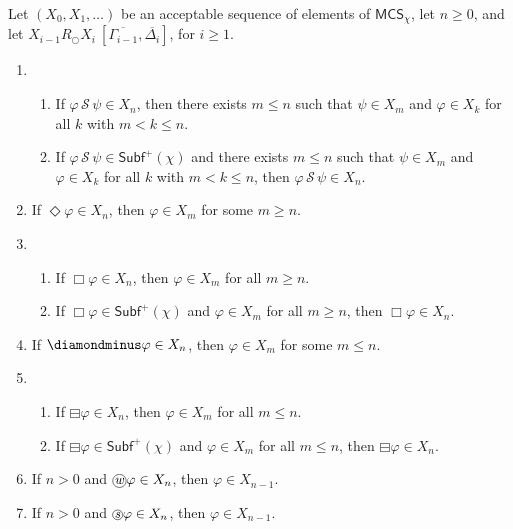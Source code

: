 \documentclass[envcountsect,envcountsame,oribibl,orivec]{llncs}
\newcommand*\circled[1]{\tikz[baseline=(char.base)]{
		\node[shape=circle,draw,inner sep=0.4pt] (char) {#1};}}
\newcommand{\lnext}{\bigcirc}
\newcommand{\lalways}{\Box}
\newcommand{\leventually}{\Diamond}
\newcommand{\lonce}{\diamondminus}
\newcommand{\lsofar}{\boxminus}
\newcommand{\lsince}{{\,\mathcal{S}\,}}
\newcommand{\wprevious}{\circled{\textit{w}}}
\newcommand{\sprevious}{\circled{\textit{s}}}
\renewcommand{\phi}{\varphi}
\newcommand{\Subf}{\mathsf{Subf}}
\newcommand{\MCS}{\mathsf{MCS}}
\newcommand{\RO}[4]{#1 R_\lnext #2\ [#3, #4]}
\begin{document}
\begin{lemma}\label{lem: MCS temporal properties}
	Let $(X_0, X_1, \ldots)$ be an acceptable sequence of elements of $\MCS_\chi$, let $n \geq 0$, and let $\RO{X_{i-1}}{X_{i}}{\overline{\Gamma_{i-1}}}{\overline{\Delta_{i}}}$, for  $i \geq 1$.
	\begin{enumerate}
		\setlength\itemsep{0.01cm}
		\item 
		\begin{enumerate}
			\item If $\phi \lsince \psi \in X_n$, then there exists $m \leq n$ such that $\psi \in X_m$ and $\phi \in X_k$ for all $k$ with $m < k \leq n$.
			
			\item If $\phi \lsince \psi \in \Subf^+(\chi)$ and there exists $m \leq n$ such that $\psi \in X_m$ and $\phi \in X_k$ for all $k$ with $m < k \leq n$, then $\phi \lsince \psi \in X_n$.
		\end{enumerate}
		
		\item If $\leventually \phi \in  X_n$, then $\phi \in  X_m$ for some $m \geq n$. 
		
		\item 
		\begin{enumerate}
			\item If $\lalways \phi \in X_n$, then $\phi \in X_m$ for all $m \geq n$. 
			
			\item If $\lalways \phi \in \Subf^+(\chi)$ and $\phi \in X_m$ for all $m \geq n$, then $\lalways \phi \in X_n$.
		\end{enumerate}
		
		\item If $\lonce \phi \in X_n$, then $\phi \in X_{m}$ for some $m \leq n$. 
		
		\item 
		\begin{enumerate}
			\item If $\lsofar \phi \in X_n$, then $\phi \in X_m$ for all $m \leq n$.
			
			\item If $\lsofar \phi \in \Subf^+(\chi)$ and $\phi \in X_m$ for all $m \leq n$, then $\lsofar \phi \in X_n$.
		\end{enumerate}
		
		
		
		\item If $n > 0$ and $\wprevious \phi \in X_n$, then $\phi \in X_{n-1}$.
		
		\item If $n > 0$ and $\sprevious \phi \in X_n$, then $\phi \in X_{n-1}$.
	\end{enumerate}
	
\end{lemma}
\end{document}

